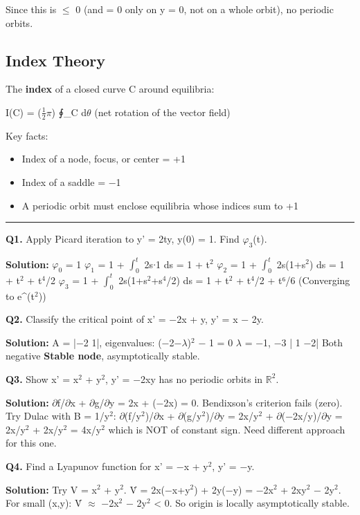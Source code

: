 \documentclass[12pt,a4paper,openany]{book}
\begin{document}
{{Since this is $\leq$ 0 (and = 0 only on y = 0, not on a whole orbit), no periodic orbits.

\subsection{Index Theory}

The \textbf{index} of a closed curve C around equilibria:

I(C) = ($\frac{1}{2}$$\pi$) ∮_C d$\theta$ (net rotation of the vector field)

Key facts:
\begin{itemize}[leftmargin=*]
  \item Index of a node, focus, or center = +1
  \item Index of a saddle = −1
  \item A periodic orbit must enclose equilibria whose indices sum to +1
\end{itemize}

\bigskip\noindent\rule{\textwidth}{0.4pt}\bigskip


\textbf{Q1.} Apply Picard iteration to y' = 2ty, y(0) = 1. Find $\varphi_3$(t).

\textbf{Solution:}
$\varphi_0$ = 1
$\varphi_1$ = 1 + $\int_0^t$ 2s$\cdot$1 ds = 1 + t$^2$
$\varphi_2$ = 1 + $\int_0^t$ 2s(1+s$^2$) ds = 1 + t$^2$ + t$^4$/2
$\varphi_3$ = 1 + $\int_0^t$ 2s(1+s$^2$+s$^4$/2) ds = 1 + t$^2$ + t$^4$/2 + t⁶/6
(Converging to e^(t$^2$))

\textbf{Q2.} Classify the critical point of x' = −2x + y, y' = x − 2y.

\textbf{Solution:} A = |−2  1|, eigenvalues: (−2−$\lambda$)$^2$ − 1 = 0  $\lambda$ = −1, −3
                  | 1 −2|
Both negative  \textbf{Stable node}, asymptotically stable.

\textbf{Q3.} Show x' = x$^2$ + y$^2$, y' = −2xy has no periodic orbits in $\mathbb{R}^2$.

\textbf{Solution:} $\partial$f/$\partial$x + $\partial$g/$\partial$y = 2x + (−2x) = 0. Bendixson's criterion fails (zero). Try Dulac with B = 1/y$^2$: $\partial$(f/y$^2$)/$\partial$x + $\partial$(g/y$^2$)/$\partial$y = 2x/y$^2$ + $\partial$(−2x/y)/$\partial$y = 2x/y$^2$ + 2x/y$^2$ = 4x/y$^2$ which is NOT of constant sign. Need different approach for this one.

\textbf{Q4.} Find a Lyapunov function for x' = −x + y$^2$, y' = −y.

\textbf{Solution:} Try V = x$^2$ + y$^2$. V̇ = 2x(−x+y$^2$) + 2y(−y) = −2x$^2$ + 2xy$^2$ − 2y$^2$.
For small (x,y): V̇ $\approx$ −2x$^2$ − 2y$^2$ < 0. So origin is locally asymptotically stable.

}}
\end{document}
